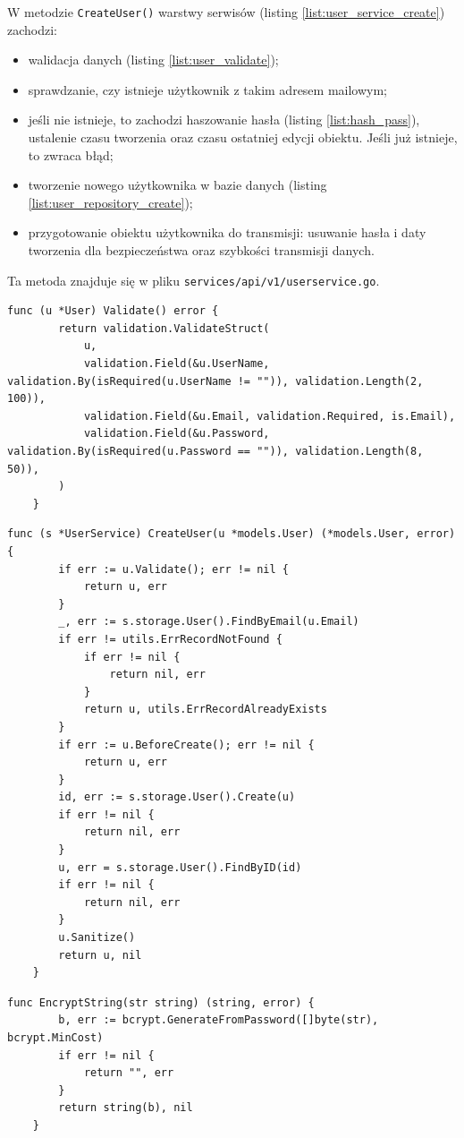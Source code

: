 W metodzie \texttt{CreateUser()} warstwy serwisów (listing \ref{list:user_service_create}) zachodzi:
\begin{itemize}
\item walidacja danych (listing \ref{list:user_validate});
\item sprawdzanie, czy istnieje użytkownik z takim adresem mailowym;
\item jeśli nie istnieje, to zachodzi haszowanie hasła (listing \ref{list:hash_pass}), ustalenie czasu tworzenia oraz czasu ostatniej edycji obiektu. Jeśli już istnieje, to zwraca błąd;
\item tworzenie nowego użytkownika w bazie danych (listing \ref{list:user_repository_create});
\item przygotowanie obiektu użytkownika do transmisji: usuwanie hasła i daty tworzenia dla bezpieczeństwa oraz szybkości transmisji danych.
\end{itemize}
Ta metoda znajduje się w pliku \texttt{services/api/v1/userservice.go}.


\begin{lstlisting}[label=list:user_validate,caption=Walidacja danych użytkownika,basicstyle=\tiny\ttfamily]
    func (u *User) Validate() error {
        return validation.ValidateStruct(
            u,
            validation.Field(&u.UserName, validation.By(isRequired(u.UserName != "")), validation.Length(2, 100)),
            validation.Field(&u.Email, validation.Required, is.Email),
            validation.Field(&u.Password, validation.By(isRequired(u.Password == "")), validation.Length(8, 50)),
        )
    }
\end{lstlisting}
\begin{lstlisting}[label=list:user_service_create,caption=Serwis tworzenia użytkownika,basicstyle=\tiny\ttfamily]
    func (s *UserService) CreateUser(u *models.User) (*models.User, error) {
        if err := u.Validate(); err != nil {
            return u, err
        }
        _, err := s.storage.User().FindByEmail(u.Email)
        if err != utils.ErrRecordNotFound {
            if err != nil {
                return nil, err
            }
            return u, utils.ErrRecordAlreadyExists
        }
        if err := u.BeforeCreate(); err != nil {
            return u, err
        }
        id, err := s.storage.User().Create(u)
        if err != nil {
            return nil, err
        }
        u, err = s.storage.User().FindByID(id)
        if err != nil {
            return nil, err
        }
        u.Sanitize()
        return u, nil
    }
\end{lstlisting}
\begin{lstlisting}[label=list:hash_pass,caption=Haszowanie hasła,basicstyle=\tiny\ttfamily]
    func EncryptString(str string) (string, error) {
        b, err := bcrypt.GenerateFromPassword([]byte(str), bcrypt.MinCost)
        if err != nil {
            return "", err
        }
        return string(b), nil
    }
\end{lstlisting}

